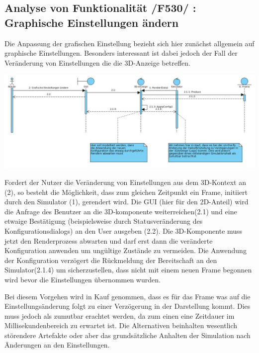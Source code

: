 \subsection{Analyse von Funktionalität /F530/ :  Graphische Einstellungen ändern}
Die Anpassung der grafischen Einstellung bezieht sich hier zunächst allgemein auf graphische Einstellungen. Besonders interessant ist dabei jedoch der Fall der Veränderung von Einstellungen die 
die 3D-Anzeige betreffen. 

\includegraphics[width=16cm]{bilder/change_graphic_config}

Fordert der Nutzer die Veränderung von Einstellungen aus dem 3D-Kontext an (2), so besteht die Möglichkeit, dass zum gleichen Zeitpunkt ein Frame, initiiert durch den Simulator (1), gerendert wird. 
Die GUI (hier für den 2D-Anteil) wird die Anfrage des Benutzer an die 3D-komponente weiterreichen(2.1) und eine etwaige Bestätigung (beispielsweise durch Statusveränderung des Konfigurationsdialogs) an den 
User ausgeben (2.2). Die 3D-Komponente muss jetzt den Renderprozess abwarten und darf erst dann die veränderte Konfiguration anwenden um ungültige Zustände zu vermeiden. Die Anwendung der Konfiguration verzögert 
die Rückmeldung der Bereitschaft an den Simulator(2.1.4) um sicherzustellen, dass nicht mit einem neuen Frame begonnen wird bevor die Einstellungen übernommen wurden. 

Bei diesem Vorgehen wird in Kauf genommen, dass es für das Frame was auf die Einstellungsänderung folgt zu einer Verzögerung in der Darstellung kommt. Dies muss jedoch als zumutbar erachtet werden, da zum einen
eine Zeitdauer im Millisekundenbereich zu erwartet ist. Die Alternativen beinhalten wesentlich störendere Artefakte oder aber das grundsätzliche Anhalten der Simulation nach Änderungen an den Einstellungen.

